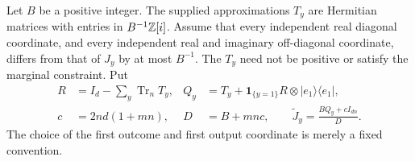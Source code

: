 Let $B$ be a positive integer. The supplied approximations $T_y$ are
Hermitian matrices with entries in $B^{-1}\mathbb Z[i]$. Assume that every
independent real diagonal coordinate, and every independent real and
imaginary off-diagonal coordinate, differs from that of $J_y$ by at
most $B^{-1}$. The $T_y$ need not be positive or satisfy the marginal
constraint. Put
\begin{align}
 R&=I_d-\sum_y\operatorname{Tr}_{n}T_y,&
 Q_y&=T_y+\mathbf1_{\{y=1\}}R\otimes|e_1\rangle\langle e_1|,
                                                    \label{eq:choirepair66}\\
 c&=2nd(1+mn),&D&=B+mnc,\qquad
 \widetilde J_y=\frac{BQ_y+cI_{dn}}{D}.\label{eq:choigrid66}
\end{align}
The choice of the first outcome and first output coordinate is merely
a fixed convention.

